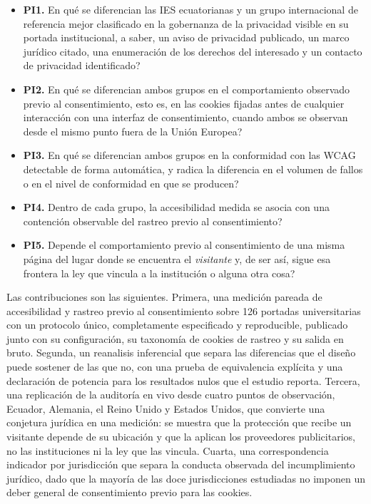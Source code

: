 \documentclass[pdflatex,sn-basic,Numbered,iicol]{sn-jnl}
\theoremstyle{thmstyleone}
\theoremstyle{thmstyletwo}
\theoremstyle{thmstylethree}
\begin{document}
\begin{itemize}
	\item \textbf{PI1.} \textquestiondown En qu\'e se diferencian las IES ecuatorianas y un grupo internacional de referencia mejor clasificado en la gobernanza de la privacidad visible en su portada institucional, a saber, un aviso de privacidad publicado, un marco jur\'idico citado, una enumeraci\'on de los derechos del interesado y un contacto de privacidad identificado?
	\item \textbf{PI2.} \textquestiondown En qu\'e se diferencian ambos grupos en el comportamiento observado previo al consentimiento, esto es, en las cookies fijadas antes de cualquier interacci\'on con una interfaz de consentimiento, cuando ambos se observan desde el mismo punto fuera de la Uni\'on Europea?
	\item \textbf{PI3.} \textquestiondown En qu\'e se diferencian ambos grupos en la conformidad con las WCAG detectable de forma autom\'atica, y radica la diferencia en el volumen de fallos o en el nivel de conformidad en que se producen?
	\item \textbf{PI4.} Dentro de cada grupo, \textquestiondown la accesibilidad medida se asocia con una contenci\'on observable del rastreo previo al consentimiento?
	\item \textbf{PI5.} \textquestiondown Depende el comportamiento previo al consentimiento de una misma p\'agina del lugar donde se encuentra el \emph{visitante} y, de ser as\'i, sigue esa frontera la ley que vincula a la instituci\'on o alguna otra cosa?
\end{itemize}

Las contribuciones son las siguientes. Primera, una medici\'on pareada de accesibilidad y rastreo previo al consentimiento sobre 126 portadas universitarias con un protocolo \'unico, completamente especificado y reproducible, publicado junto con su configuraci\'on, su taxonom\'ia de cookies de rastreo y su salida en bruto. Segunda, un reanalisis inferencial que separa las diferencias que el dise\~no puede sostener de las que no, con una prueba de equivalencia expl\'icita y una declaraci\'on de potencia para los resultados nulos que el estudio reporta. Tercera, una replicaci\'on de la auditor\'ia en vivo desde cuatro puntos de observaci\'on, Ecuador, Alemania, el Reino Unido y Estados Unidos, que convierte una conjetura jur\'idica en una medici\'on: se muestra que la protecci\'on que recibe un visitante depende de su ubicaci\'on y que la aplican los proveedores publicitarios, no las instituciones ni la ley que las vincula. Cuarta, una correspondencia indicador por jurisdicci\'on que separa la conducta observada del incumplimiento jur\'idico, dado que la mayor\'ia de las doce jurisdicciones estudiadas no imponen un deber general de consentimiento previo para las cookies.
\end{document}
